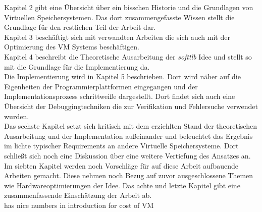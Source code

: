 Kapitel 2 gibt eine Übersicht über ein bisschen Historie und die Grundlagen von Virtuellen
Speichersystemen. Das dort zusammengefasste Wissen stellt die Grundlage für den restlichen Teil der
Arbeit dar.\\
Kapitel 3 beschäftigt sich mit verwandten Arbeiten die sich auch mit der Optimierung des VM Systems
beschäftigen.\\
Kapitel 4 beschreibt die Theoretische Ausarbeitung der \textit{softtlb} Idee und stellt so mit die
Grundlage für die Implementierung da.\\
Die Implementierung wird in Kapitel 5 beschrieben. Dort wird näher auf die Eigenheiten der
Programmierplattformen eingegangen und der Implementationsprozess schrittweiße dargestellt.
Dort findet sich auch eine Übersicht der Debuggingtechniken die zur Verifikation und Fehlersuche
verwendet wurden.\\
Das sechste Kapitel setzt sich kritisch mit dem erziehlten Stand der theoretischen Ausarbeitung und
der Implementation außeinander und beleuchtet das Ergebnis im lichte typischer Requirements an
andere Virtuelle Speichersysteme. Dort schließt sich noch eine Diskussion über eine weitere
Vertiefung des Ansatzes an.\\
Im siebten Kapitel werden noch Vorschläge für auf diese Arbeit aufbauende Arbeiten gemacht. Diese
nehmen noch Bezug auf zuvor ausgeschlossene Themen wie Hardwareoptimierungen der Idee.
Das achte und letzte Kapitel gibt eine zusammenfassende Einschätzung der Arbeit ab.\\






\cite{zagieboylo2020cost} has nice numbers in introduction for cost of VM